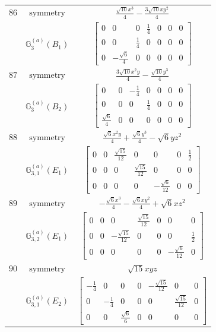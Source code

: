 \documentclass[fleqn,8pt,landscape]{jsarticle}
\begin{document}
\begin{longtable}{ccc}
$ 86 $ & $ \text{symmetry} $ & $ \frac{\sqrt{10} x^{3}}{4} - \frac{3 \sqrt{10} x y^{2}}{4} $ \\
$  $ & $ \mathbb{G}_{3}^{(a)}(B_{1}) $ & $ \begin{bmatrix} 0 & 0 & 0 & \frac{1}{4} & 0 & 0 & 0 \\ 0 & 0 & \frac{1}{4} & 0 & 0 & 0 & 0 \\ 0 & - \frac{\sqrt{6}}{4} & 0 & 0 & 0 & 0 & 0 \end{bmatrix} $ \\ \hline
$ 87 $ & $ \text{symmetry} $ & $ \frac{3 \sqrt{10} x^{2} y}{4} - \frac{\sqrt{10} y^{3}}{4} $ \\
$  $ & $ \mathbb{G}_{3}^{(a)}(B_{2}) $ & $ \begin{bmatrix} 0 & 0 & - \frac{1}{4} & 0 & 0 & 0 & 0 \\ 0 & 0 & 0 & \frac{1}{4} & 0 & 0 & 0 \\ \frac{\sqrt{6}}{4} & 0 & 0 & 0 & 0 & 0 & 0 \end{bmatrix} $ \\ \hline
$ 88 $ & $ \text{symmetry} $ & $ \frac{\sqrt{6} x^{2} y}{4} + \frac{\sqrt{6} y^{3}}{4} - \sqrt{6} y z^{2} $ \\
$  $ & $ \mathbb{G}_{3,1}^{(a)}(E_{1}) $ & $ \begin{bmatrix} 0 & 0 & \frac{\sqrt{15}}{12} & 0 & 0 & 0 & \frac{1}{2} \\ 0 & 0 & 0 & \frac{\sqrt{15}}{12} & 0 & 0 & 0 \\ 0 & 0 & 0 & 0 & - \frac{\sqrt{6}}{12} & 0 & 0 \end{bmatrix} $ \\ \hline
$ 89 $ & $ \text{symmetry} $ & $ - \frac{\sqrt{6} x^{3}}{4} - \frac{\sqrt{6} x y^{2}}{4} + \sqrt{6} x z^{2} $ \\
$  $ & $ \mathbb{G}_{3,2}^{(a)}(E_{1}) $ & $ \begin{bmatrix} 0 & 0 & 0 & \frac{\sqrt{15}}{12} & 0 & 0 & 0 \\ 0 & 0 & - \frac{\sqrt{15}}{12} & 0 & 0 & 0 & \frac{1}{2} \\ 0 & 0 & 0 & 0 & 0 & - \frac{\sqrt{6}}{12} & 0 \end{bmatrix} $ \\ \hline
$ 90 $ & $ \text{symmetry} $ & $ \sqrt{15} x y z $ \\
$  $ & $ \mathbb{G}_{3,1}^{(a)}(E_{2}) $ & $ \begin{bmatrix} - \frac{1}{4} & 0 & 0 & 0 & - \frac{\sqrt{15}}{12} & 0 & 0 \\ 0 & - \frac{1}{4} & 0 & 0 & 0 & \frac{\sqrt{15}}{12} & 0 \\ 0 & 0 & \frac{\sqrt{6}}{6} & 0 & 0 & 0 & 0 \end{bmatrix} $ \\ \hline

\end{longtable}
\end{document}
